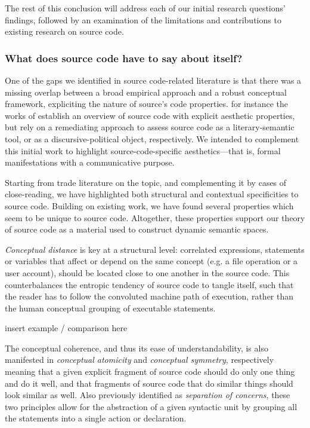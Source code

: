 The rest of this conclusion will address each of our initial research questions' findings, followed by an examination of the limitations and contributions to existing research on source code.

\subsubsection{What does source code have to say about itself?} %

One of the gaps we identified in source code-related literature is that there was a missing overlap between a broad empirical approach and a robust conceptual framework, expliciting the nature of source's code properties. for instance the works of \citep{paloque-berges_poetique_2009,cox_speaking_2013} establish an overview of source code with explicit aesthetic properties, but rely on a remediating approach to assess source code as a literary-semantic tool, or as a discursive-political object, respectively. We intended to complement this initial work to highlight source-code-specific aesthetics—that is, formal manifestations with a communicative purpose.

Starting from trade literature on the topic, and complementing it by cases of close-reading, we have highlighted both structural and contextual specificities to source code. Building on existing work, we have found several properties which seem to be unique to source code. Altogether, these properties support our theory of source code as a material used to construct dynamic semantic spaces.

\emph{Conceptual distance} is key at a structural level: correlated expressions, statements or variables that affect or depend on the same concept (e.g. a file operation or a user account), should be located close to one another in the source code. This counterbalances the entropic tendency of source code to tangle itself, such that the reader has to follow the convoluted machine path of execution, rather than the human conceptual grouping of executable statements.

\begin{listing}
    insert example / comparison here
\end{listing}

The conceptual coherence, and thus its ease of understandability, is also manifested in \emph{conceptual atomicity} and \emph{conceptual symmetry}, respectively meaning that a given explicit fragment of source code should do only one thing and do it well, and that fragments of source code that do similar things should look similar as well. Also previously identified as \emph{separation of concerns}, these two principles allow for the abstraction of a given syntactic unit by grouping all the statements into a single action or declaration.

